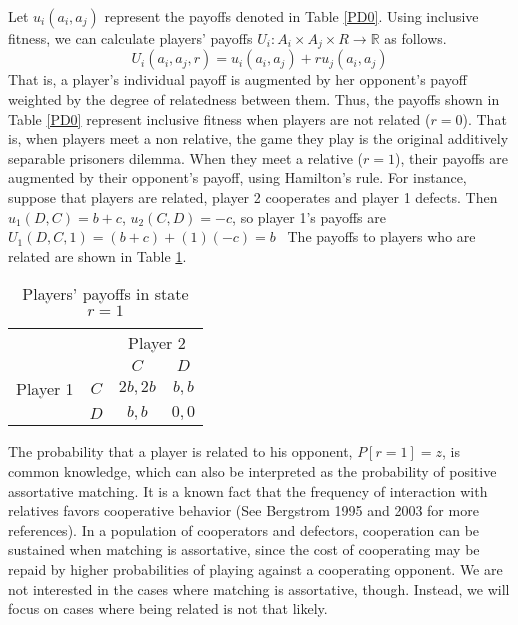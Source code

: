 \documentclass[12pt]{article}
\begin{document}
Let $u_{i}(a_{i},a_{j})$ represent the payoffs denoted in Table \ref{PD0}. Using inclusive fitness, we can calculate players' payoffs $U_{i}:A_{i}\times A_{j} \times R \rightarrow \mathbb{R}$ as follows.
\begin{equation}
 U_{i}(a_{i},a_{j}, r)=u_{i}(a_{i},a_{j})+ru_{j}(a_{i},a_{j})
\end{equation} 
That is, a player's individual payoff is augmented by her opponent's payoff weighted by the degree of relatedness between them. Thus, the payoffs shown in Table \ref{PD0} represent inclusive fitness when players are not related ($r=0$). That is, when players meet a non relative, the game they play is the original additively separable prisoners dilemma. When they meet a relative ($r=1$), their payoffs are augmented by their opponent's payoff, using Hamilton's rule. For instance, suppose that players are related, player 2 cooperates and player 1 defects. Then $u_{1}(D,C)=b+c$, $u_{2}(C,D)=-c$, so player 1's payoffs are $U_{1}(D,C,1)=(b+c)+(1)(-c)=b$ \ The payoffs to players who are related are shown in Table \ref{table:R1}.

\begin{table}[h]
\center 
\caption{Players' payoffs in state $r=1$} \vspace{1ex}
	\begin{tabular}{cc|c|c|}
	\multicolumn{2}{c}{}  & \multicolumn{2}{c}{\small Player 2} \\
	& \multicolumn{1}{c}{} & \multicolumn{1}{c}{$C$} & \multicolumn{1}{c}{$D$} \\
	\cline{3-4}
	{\small Player 1} & $C$ & \multicolumn{1}{|c}{$2b,2b$} & \multicolumn{1}{|c|}{$%
	b,b $} \\ \cline{3-4} & $D$ & \multicolumn{1}{|c}{$b,b$} &
	\multicolumn{1}{|c|}{$0,0$} \\ \cline{3-4}
	\end{tabular}
\label{table:R1}
\end{table}

The probability that a player is related to his opponent, $P[r=1]=z$, is common knowledge, which can also be interpreted as the probability of positive assortative matching. It is a known fact that the frequency of interaction with relatives favors cooperative behavior (See Bergstrom 1995 and 2003 for more references). In a population of cooperators and defectors, cooperation can be sustained when matching is assortative, since the cost of cooperating may be repaid by higher probabilities of playing against a cooperating opponent. We are not interested in the cases where matching is assortative, though. Instead, we will focus on cases where being related is not that likely.
\end{document}
